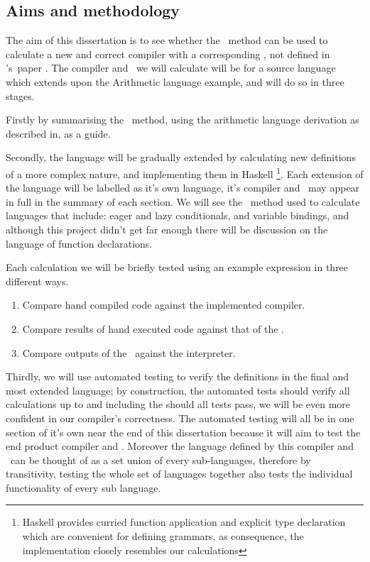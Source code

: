 \documentclass {article}
\begin{document}
\subsection{Aims and methodology}

The aim of this dissertation is to
see whether the \BH\ method can
be used to calculate a new and correct compiler
with a corresponding \vm, 
not defined in \BH's\ paper \cite{bandh}.
The compiler and \vm\ we will calculate 
will be for a source language which extends 
upon the Arithmetic language example\cite[Section 2]{bandh},
and will do so in three stages.

Firstly by summarising the \BH\ method,
using the arithmetic language derivation 
as described in, as a guide.

Secondly, the language will be gradually extended
by calculating new definitions of a more complex nature,
and implementing them in Haskell
\footnote{Haskell provides curried function application
		and explicit type declaration which are
		convenient for defining grammars,
		as consequence, the implementation closely
		resembles our calculations}.
Each extension of the language will be labelled 
as it's own language, it's compiler and \vm\ 
may appear in full in the summary of each section.
We will see the \BH\ method used to calculate
languages that include: eager and lazy conditionals, 
and variable bindings,
and although this project didn't get far enough
there will be discussion on the 
language of function declarations.

Each calculation we will be briefly tested
using an example expression
in three different ways.

\begin{enumerate}
	\item Compare hand compiled code against the
		implemented compiler.
	\item Compare results of hand executed code 
		against that of the \vm.
	\item Compare outputs of the \vm\ against the interpreter.
\end{enumerate}

Thirdly, we will use automated testing
to verify the definitions in the final
and most extended language; 
by construction, the automated
tests should verify all calculations up
to and including the 
should all tests pass, we will
be even more confident in our 
compiler's correctness.
The automated testing will all be in one section of it's own
near the end of this dissertation
because it will aim to test the end product compiler and \vm.
Moreover the language defined by this compiler and \vm\
can be thought of as a set union of every sub-languages,
therefore by transitivity, testing 
the whole set of languages together
also tests the individual functionality of every sub language.
\end{document}
